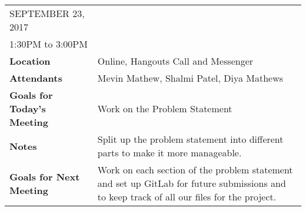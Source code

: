 \documentclass{article}
\begin{document}
\begin{table}[hp]
\begin{tabularx}{\textwidth}{lX}
\toprule
SEPTEMBER 23, 2017\\
1:30PM to 3:00PM\\
\midrule
\textbf{Location} & Online, Hangouts Call and Messenger\\
\textbf{Attendants} & Mevin Mathew, Shalmi Patel, Diya Mathews\\
\midrule
\textbf{Goals for Today's Meeting} & Work on the Problem Statement\\
\midrule
\textbf{Notes} & Split up the problem statement into different parts to make it more manageable.\\
\midrule
\textbf{Goals for Next Meeting} & Work on each section of the problem statement and set up GitLab for future submissions and to keep track of all our files for the project.\\
\bottomrule
\end{tabularx}
\end{table}
\end{document}
